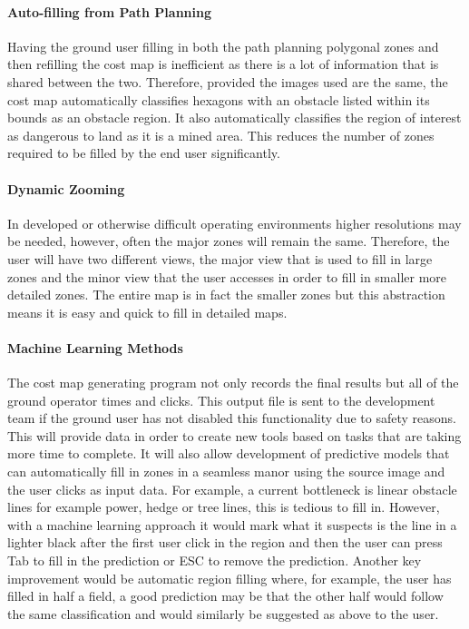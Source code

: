 \paragraph{Auto-filling from Path Planning}
Having the ground user filling in both the path planning polygonal zones and then refilling the cost map is inefficient as there is a lot of information that is shared between the two. Therefore, provided the images used are the same, the cost map automatically classifies hexagons with an obstacle listed within its bounds as an obstacle region. It also automatically classifies the region of interest as dangerous to land as it is a mined area. This reduces the number of zones required to be filled by the end user significantly. 
\paragraph{Dynamic Zooming}
In developed or otherwise difficult operating environments higher resolutions may be needed, however, often the major zones will remain the same. Therefore, the user will have two different views, the major view that is used to fill in large zones and the minor view that the user accesses in order to fill in smaller more detailed zones. The entire map is in fact the smaller zones but this abstraction means it is easy and quick to fill in detailed maps.
\paragraph{Machine Learning Methods}
The cost map generating program not only records the final results but all of the ground operator times and clicks. This output file is  sent to the development team if the ground user has not disabled this functionality due to safety reasons. This will provide data in order to create new tools based on tasks that are taking more time to complete. It will also allow development of predictive models that can automatically fill in zones in a seamless manor using the source image and the user clicks as input data. For example, a current bottleneck is linear obstacle lines for example power, hedge or tree lines, this is tedious to fill in. However, with a machine learning approach it would mark what it suspects is the line in a lighter black after the first user click in the region and then the user can press Tab to fill in the prediction or ESC to remove the prediction. Another key improvement would be automatic region filling where, for example, the user has filled in half a field, a good prediction may be that the other half would follow the same classification and would similarly be suggested as above to the user.